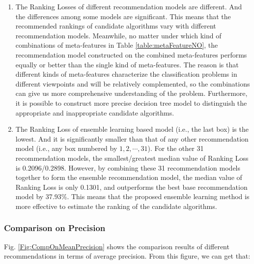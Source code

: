 \documentclass[prodmode,acmtkdd]{acmsmall}
\begin{document}
\begin{enumerate}
    \item The Ranking Losses of different recommendation models are
    different. And the differences among some models are
    significant. This means that the recommended rankings of candidate algorithms
    vary with different recommendation models. Meanwhile, no matter
    under which kind of combinations of meta-features in Table
    \ref{table:metaFeatureNO}, the recommendation model constructed on the combined meta-features
    performs equally or better than the single kind of
    meta-features. The reason is that different kinds of
    meta-features characterize the classification problems in different
    viewpoints and will be relatively complemented, so the combinations can give us more
    comprehensive understanding of the problem. Furthermore, it is
    possible to construct more precise decision tree model to
    distinguish the appropriate and inappropriate candidate algorithms.

    \item The Ranking Loss of ensemble learning based model (i.e., the last box) is the
    lowest. And it is significantly smaller than that of any other
    recommendation model (i.e., any box numbered by
    $1,2,\cdots,31$). For the other 31 recommendation models, the
    smallest/greatest median value of Ranking Loss is 0.2096/0.2898.
    However, by combining these 31 recommendation models together
    to form the ensemble recommendation model, the median value of
    Ranking Loss is only 0.1301, and outperforms the best base
    recommendation model by 37.93\%. This means that the proposed ensemble learning
    method is more effective to estimate the ranking of the
    candidate algorithms.
\end{enumerate}


\subsubsection{Comparison on Precision}

Fig. \ref{Fig:CompOnMeanPrecision} shows the comparison results of
different recommendations in terms of average precision. From this
figure, we can get that:
\end{document}
